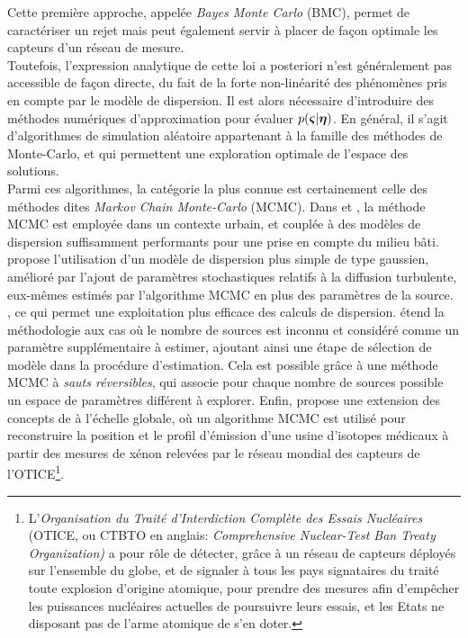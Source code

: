 Cette première approche, appelée \textit{Bayes Monte Carlo} (BMC), permet de caractériser un rejet mais peut également servir à placer de façon optimale les capteurs d'un réseau de mesure. \\

Toutefois, l'expression analytique de cette loi a posteriori n'est généralement  pas accessible de façon directe, du fait de la forte non-linéarité des phénomènes pris en compte par le modèle de dispersion. Il est alors nécessaire d'introduire des méthodes numériques d'approximation pour évaluer  $p({\bm{\varsigma}} | {\bm{\eta}})$. En général, il s'agit d'algorithmes de simulation aléatoire appartenant à la famille des méthodes de Monte-Carlo, et qui permettent une exploration optimale de l'espace des solutions.\\

Parmi ces algorithmes, la catégorie la plus connue est certainement celle des méthodes dites \textit{Markov Chain Monte-Carlo} (MCMC). Dans \cite{Keats2007} et \cite{Chow2008}, la méthode MCMC est employée dans un contexte urbain, et couplée à des modèles de dispersion suffisamment performants pour une prise en compte du milieu bâti. \cite{Senocak2008} propose l'utilisation d'un modèle de dispersion plus simple de type gaussien, amélioré par l'ajout de paramètres stochastiques relatifs à la diffusion turbulente, eux-mêmes estimés par l'algorithme MCMC en plus des paramètres de la source. , ce qui permet une exploitation plus efficace des calculs de dispersion. \cite{Yee2008b} étend la méthodologie aux cas où le nombre de sources est inconnu et considéré comme un paramètre supplémentaire à estimer, ajoutant ainsi une étape de sélection de modèle dans la procédure d'estimation. Cela est possible grâce à une méthode MCMC à \textit{sauts réversibles}, qui associe pour chaque nombre de sources possible un espace de paramètres différent à explorer. Enfin, \cite{Yee2014} propose une extension des concepts de \cite{Keats2007} à l'échelle globale, où un algorithme MCMC est utilisé pour reconstruire la position et le profil d'émission d'une usine d'isotopes médicaux à partir des mesures de xénon relevées par le réseau mondial des capteurs de l'OTICE\footnote{L'\textit{Organisation du Traité d'Interdiction Complète des Essais Nucléaires} (OTICE, ou CTBTO en anglais: \textit{Comprehensive Nuclear-Test Ban Treaty Organization)} a pour rôle de détecter, grâce à un réseau de capteurs déployés sur l'ensemble du globe, et de signaler à tous les pays signataires du traité toute explosion d'origine atomique, pour prendre des mesures afin d'empêcher les puissances nucléaires actuelles de poursuivre leurs essais, et les Etats ne disposant pas de l'arme atomique de s'en doter.}. \\

